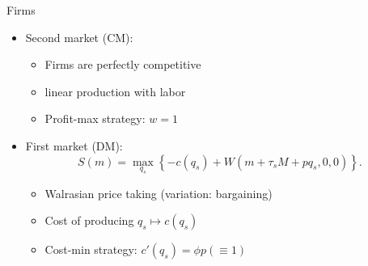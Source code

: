 \documentclass[10pt,english,slidetop,compress,
              blue,mathserif,color=option]{beamer}
\theoremstyle{plain}
\theoremstyle{definition}
\begin{document}
\begin{frame}{Firms}

  \begin{itemize}
    \item Second market (CM):
      \begin{itemize}
        \item Firms are perfectly competitive
        \item linear production with labor
        \item Profit-max strategy: $w = 1$
      \end{itemize}

      \bigskip

    \item First market (DM):
        \begin{equation*}
          \label{firmvalDM}
          S(m)
            =
            \max_{q_{s}}
            \left\{
              -c(q_{s})
              + W(m+\tau_{s}M + pq_{s},0,0)
            \right\}.
        \end{equation*}
      \begin{itemize}
        \item Walrasian price taking (variation: bargaining)
        \item Cost of producing $q_{s} \mapsto c(q_{s})$
        \item Cost-min strategy: $c'(q_{s}) = \phi p (\equiv 1)$
      \end{itemize}
  \end{itemize}

\end{frame}
\end{document}
